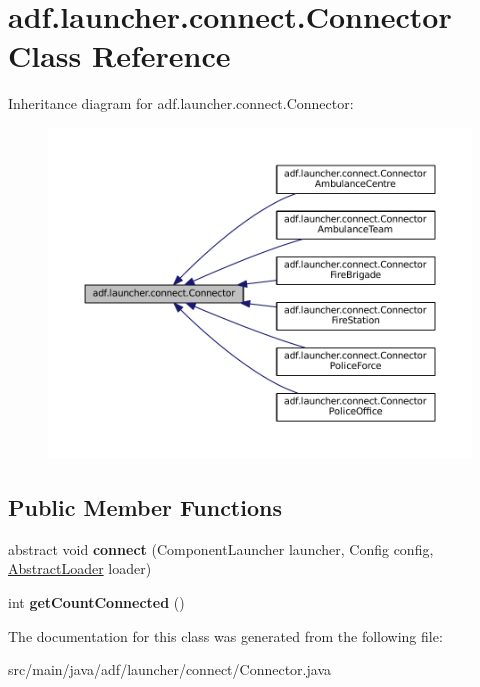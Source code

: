 \hypertarget{classadf_1_1launcher_1_1connect_1_1Connector}{}\section{adf.\+launcher.\+connect.\+Connector Class Reference}
\label{classadf_1_1launcher_1_1connect_1_1Connector}


Inheritance diagram for adf.\+launcher.\+connect.\+Connector\+:
\nopagebreak
\begin{figure}[H]
\begin{center}
\leavevmode
\includegraphics[width=350pt]{classadf_1_1launcher_1_1connect_1_1Connector__inherit__graph}
\end{center}
\end{figure}
\subsection*{Public Member Functions}
\begin{DoxyCompactItemize}
\item 
\hypertarget{classadf_1_1launcher_1_1connect_1_1Connector_a0a0ac7fbfd9dd2849165907439b972e5}{}\label{classadf_1_1launcher_1_1connect_1_1Connector_a0a0ac7fbfd9dd2849165907439b972e5} 
abstract void {\bfseries connect} (Component\+Launcher launcher, Config config, \hyperlink{classadf_1_1component_1_1AbstractLoader}{Abstract\+Loader} loader)
\item 
\hypertarget{classadf_1_1launcher_1_1connect_1_1Connector_adb8014f72e8e70fe7eb877b17e7c9f7d}{}\label{classadf_1_1launcher_1_1connect_1_1Connector_adb8014f72e8e70fe7eb877b17e7c9f7d} 
int {\bfseries get\+Count\+Connected} ()
\end{DoxyCompactItemize}


The documentation for this class was generated from the following file\+:\begin{DoxyCompactItemize}
\item 
src/main/java/adf/launcher/connect/Connector.\+java\end{DoxyCompactItemize}
